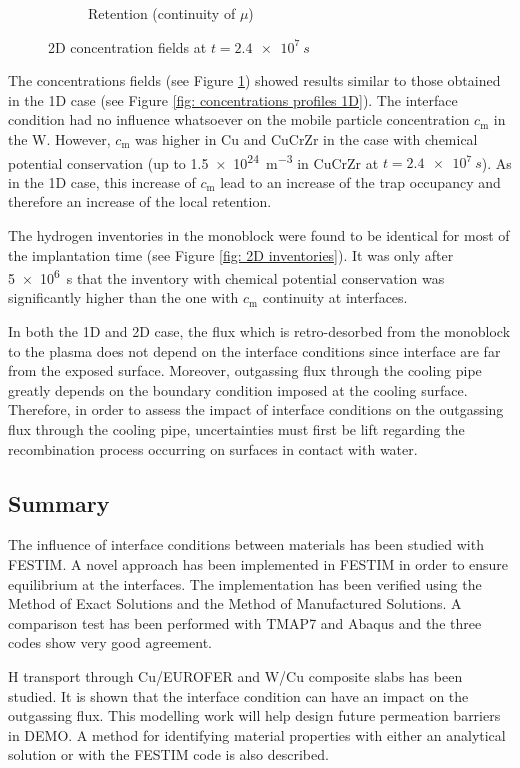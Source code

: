 \begin{figure}
\begin{subfigure}{0.5\linewidth}
        \caption{Retention (continuity of $\mu$)}
    \end{subfigure}
    \caption{2D concentration fields at $t=\SI{2.4e7}{s}$}
    \label{fig: concentrations fields 2d}
\end{figure}

The concentrations fields (see Figure \ref{fig: concentrations fields 2d}) showed results similar to those obtained in the 1D case (see Figure \ref{fig: concentrations profiles 1D}).
The interface condition had no influence whatsoever on the mobile particle concentration $c_\mathrm{m}$ in the W.
However, $c_\mathrm{m}$ was higher in Cu and CuCrZr in the case with chemical potential conservation (up to \SI{1.5e24}{m^{-3}} in CuCrZr at $t=\SI{2.4e7}{s}$).
As in the 1D case, this increase of $c_\mathrm{m}$ lead to an increase of the trap occupancy and therefore an increase of the local retention.

The hydrogen inventories in the monoblock were found to be identical for most of the implantation time (see Figure \ref{fig: 2D inventories}).
It was only after \SI{5e6}{s} that the inventory with chemical potential conservation was significantly higher than the one with $c_\mathrm{m}$ continuity at interfaces.

In both the 1D and 2D case, the flux which is retro-desorbed from the monoblock to the plasma does not depend on the interface conditions since interface are far from the exposed surface.
Moreover, outgassing flux through the cooling pipe greatly depends on the boundary condition imposed at the cooling surface.
Therefore, in order to assess the impact of interface conditions on the outgassing flux through the cooling pipe, uncertainties must first be lift regarding the recombination process occurring on surfaces in contact with water.

\subsection{Summary}

The influence of interface conditions between materials has been studied with FESTIM.
A novel approach has been implemented in FESTIM in order to ensure equilibrium at the interfaces.
The implementation has been verified using the Method of Exact Solutions and the Method of Manufactured Solutions.
A comparison test has been performed with TMAP7 and Abaqus and the three codes show very good agreement.

H transport through Cu/EUROFER and W/Cu composite slabs has been studied.
It is shown that the interface condition can have an impact on the outgassing flux.
This modelling work will help design future permeation barriers in DEMO.
A method for identifying material properties with either an analytical solution or with the FESTIM code is also described.

